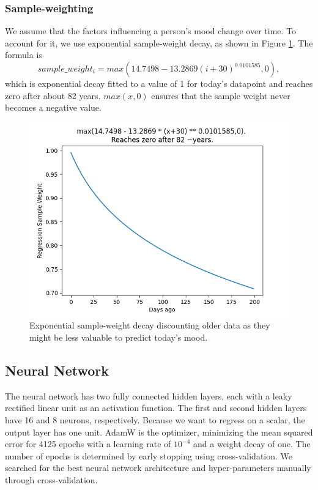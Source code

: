\documentclass[conference]{IEEEtran}
\begin{document}
\subsubsection{Sample-weighting}
We assume that the factors influencing a person's mood change over time. To account for it, we use exponential sample-weight decay, as shown in Figure \ref{fig:sample-weight}. 
The formula is 
\begin{equation}
sample\_weight_i = max(14.7498-13.2869(i + 30)^{0.0101585},0),
\end{equation}
which is exponential decay fitted to a value of 1 for today's datapoint and reaches zero after about 82 years. $max(x,0)$ ensures that the sample weight never becomes a negative value. 
\begin{figure}[htbp]
\begin{center}
\includegraphics[width=1\linewidth]{figs/RegressionSampleWeight.png}
\caption[Sample weight]{Exponential sample-weight decay discounting older data as they might be less valuable to predict today's mood.}
\label{fig:sample-weight}
\end{center}
\end{figure}


\subsection{Neural Network}
The neural network has two fully connected hidden layers, each with a leaky rectified linear unit\cite{xu_empirical_2015} as an activation function. The first and second hidden layers have 16 and 8 neurons, respectively. Because we want to regress on a scalar, the output layer has one unit. AdamW\cite{loshchilov_decoupled_2019} is the optimizer, minimizing the mean squared error for 4125 epochs with a learning rate of $10^{-4}$ and a weight decay of one. The number of epochs is determined by early stopping using cross-validation\cite{prechelt_automatic_1998}.
We searched for the best neural network architecture and hyper-parameters manually through cross-validation.
\end{document}

